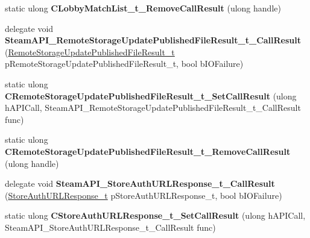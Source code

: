 \begin{DoxyCompactItemize}
\item 
\mbox{\label{class_valve_1_1_interop_1_1_native_entrypoints_a0965d77519417091889472fd406bbaba}} 
static ulong {\bfseries C\+Lobby\+Match\+List\+\_\+t\+\_\+\+Remove\+Call\+Result} (ulong handle)
\item 
\mbox{\label{class_valve_1_1_interop_1_1_native_entrypoints_ab75c05c486be4e976619949a7950ee3d}} 
delegate void {\bfseries Steam\+A\+P\+I\+\_\+\+Remote\+Storage\+Update\+Published\+File\+Result\+\_\+t\+\_\+\+Call\+Result} (\hyperlink{struct_valve_1_1_steamworks_1_1_remote_storage_update_published_file_result__t}{Remote\+Storage\+Update\+Published\+File\+Result\+\_\+t} p\+Remote\+Storage\+Update\+Published\+File\+Result\+\_\+t, bool b\+I\+O\+Failure)
\item 
\mbox{\label{class_valve_1_1_interop_1_1_native_entrypoints_a467da5ca184b0be5292f67b3893c1481}} 
static ulong {\bfseries C\+Remote\+Storage\+Update\+Published\+File\+Result\+\_\+t\+\_\+\+Set\+Call\+Result} (ulong h\+A\+P\+I\+Call, Steam\+A\+P\+I\+\_\+\+Remote\+Storage\+Update\+Published\+File\+Result\+\_\+t\+\_\+\+Call\+Result func)
\item 
\mbox{\label{class_valve_1_1_interop_1_1_native_entrypoints_a04e8eaae52d9d857f7f5dd07a256f702}} 
static ulong {\bfseries C\+Remote\+Storage\+Update\+Published\+File\+Result\+\_\+t\+\_\+\+Remove\+Call\+Result} (ulong handle)
\item 
\mbox{\label{class_valve_1_1_interop_1_1_native_entrypoints_a23afc3e409a187af5ea8e1e34fd05dc1}} 
delegate void {\bfseries Steam\+A\+P\+I\+\_\+\+Store\+Auth\+U\+R\+L\+Response\+\_\+t\+\_\+\+Call\+Result} (\hyperlink{struct_valve_1_1_steamworks_1_1_store_auth_u_r_l_response__t}{Store\+Auth\+U\+R\+L\+Response\+\_\+t} p\+Store\+Auth\+U\+R\+L\+Response\+\_\+t, bool b\+I\+O\+Failure)
\item 
\mbox{\label{class_valve_1_1_interop_1_1_native_entrypoints_af8187c24aefdd4d1bb97c2e8c02ff631}} 
static ulong {\bfseries C\+Store\+Auth\+U\+R\+L\+Response\+\_\+t\+\_\+\+Set\+Call\+Result} (ulong h\+A\+P\+I\+Call, Steam\+A\+P\+I\+\_\+\+Store\+Auth\+U\+R\+L\+Response\+\_\+t\+\_\+\+Call\+Result func)

\end{DoxyCompactItemize}
